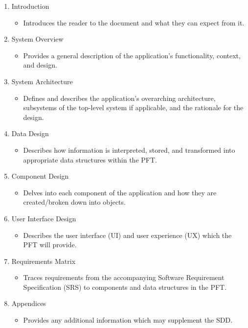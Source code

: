 \documentclass{article}
\begin{document}
\begin{enumerate}
    \item Introduction
    \begin{itemize}
        \item Introduces the reader to the document and what they can expect from it.
    \end{itemize}
    \item System Overview
    \begin{itemize}
        \item Provides a general description of the application's functionality, context, and design.
    \end{itemize}
    \item System Architecture
    \begin{itemize}
        \item Defines and describes the application's overarching architecture, subsystems of the top-level system if applicable, and the rationale for the design.
    \end{itemize}
    \item Data Design
    \begin{itemize}
        \item Describes how information is interpreted, stored, and transformed into appropriate data structures within the PFT.
    \end{itemize}
    \item Component Design
    \begin{itemize}
        \item Delves into each component of the application and how they are created/broken down into objects.
    \end{itemize}
    \item User Interface Design
    \begin{itemize}
        \item Describes the user interface (UI) and user experience (UX) which the PFT will provide.
    \end{itemize}
    \item Requirements Matrix
    \begin{itemize}
        \item Traces requirements from the accompanying Software Requirement Specification (SRS) to components and data structures in the PFT.
    \end{itemize}
    \item Appendices
    \begin{itemize}
        \item Provides any additional information which may supplement the SDD.
    \end{itemize}
\end{enumerate}
\end{document}
